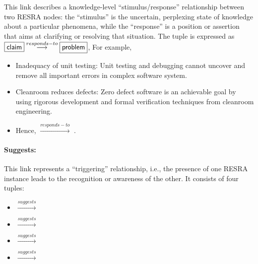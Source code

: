 This link describes a knowledge-level ``stimulus/response'' relationship
between two RESRA nodes: the ``stimulus'' is the uncertain, perplexing state
of knowledge about a particular phenomena, while the ``response'' is a
position or assertion that aims at clarifying or resolving that situation.
The tuple is expressed as \( \fbox{{\sf
claim}}\stackrel{responds-to}{\longrightarrow} \fbox{{\sf problem}} \),  For
example,

\small
\begin{itemize}
\item {\sf Inadequacy of unit testing}: Unit testing and debugging cannot
  uncover and remove all important errors in complex software system.
  
\item {\sf Cleanroom reduces defects}: Zero defect software is an
  achievable goal by using rigorous development and formal verification
  techniques from cleanroom engineering.
  
\item Hence, \hspace{.1in} \(
  \stackrel{responds-to}{\longrightarrow} \) .
\end{itemize}
\normalsize


\paragraph{Suggests:}

This link represents a ``triggering'' relationship, i.e., the presence of
one RESRA instance leads to the recognition or awareness of the other. It
consists of four tuples:

\begin{itemize}
\item {} \( \stackrel{suggests}{\longrightarrow} \)
  
\item {} \( \stackrel{suggests}{\longrightarrow} \)
  
\item {} \( \stackrel{suggests}{\longrightarrow} \)
  
\item {} \( \stackrel{suggests}{\longrightarrow} \)
\end{itemize}


